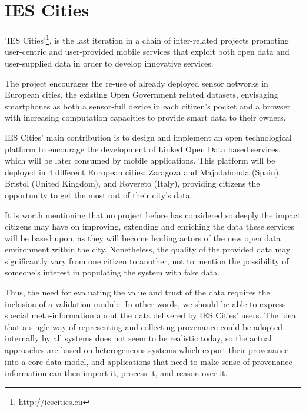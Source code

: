 \section{IES Cities}
\label{sec:ies_cities}

'IES Cities'\footnote{\url{http://iescities.eu}}, is the last iteration in a chain of inter-related projects promoting user-centric and user-provided mobile services that exploit both open data and user-supplied data in order to develop innovative services.

The project encourages the re-use of already deployed sensor networks in European cities, the existing Open Government related datasets, envisaging smartphones as both a sensor-full device in each citizen's pocket and a browser with increasing computation capacities to provide smart data to their owners.

IES Cities' main contribution is to design and implement an open technological platform to encourage the development of Linked Open Data based services, which will be later consumed by mobile applications. This platform will be deployed in 4 different European cities: Zaragoza and Majadahonda (Spain), Bristol (United Kingdom), and Rovereto (Italy), providing citizens the opportunity to get the most out of their city's data.

It is worth mentioning that no project before has considered so deeply the impact citizens may have on improving, extending and enriching the data these services will be based upon, as they will become leading actors of the new open data environment within the city. Nonetheless, the quality of the provided data may significantly vary from one citizen to another, not to mention the possibility of someone's interest in populating the system with fake data.

Thus, the need for evaluating the value and trust of the data requires the inclusion of a validation module\cite{hartig_publishing_2010}. In other words, we should be able to express special meta-information about the data delivered by IES Cities' users. The idea that a single way of representing and collecting provenance could be adopted internally by all systems does not seem to be realistic today, so the actual approaches are based on heterogeneous systems which export their provenance into a core data model, and applications that need to make sense of provenance information can then import it, process it, and reason over it\cite{ceolin2012trust}.
